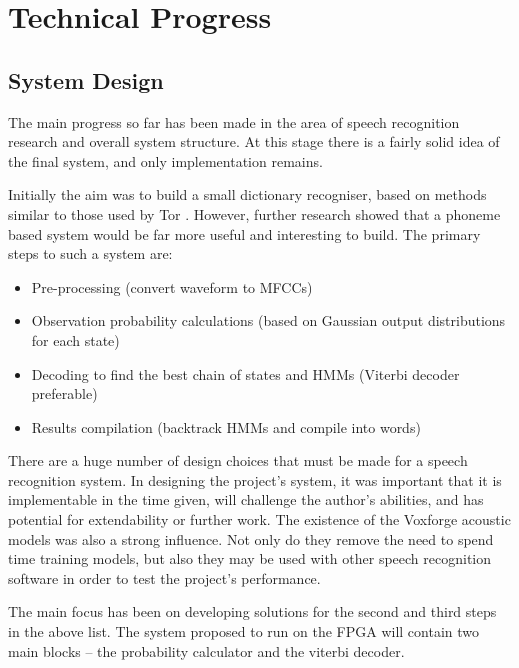 \chapter{Technical Progress} %
\label{cha:technical_progress}


\section{System Design} %
\label{sec:system_design}
The main progress so far has been made in the area of speech recognition research and overall system structure.  At this stage there is a fairly solid idea of the final system, and only implementation remains.

Initially the aim was to build a small dictionary recogniser, based on methods similar to those used by Tor \cite{tor2003}.  However, further research showed that a phoneme based system would be far more useful and interesting to build.  The primary steps to such a system are:
\begin{itemize}
	\item Pre-processing (convert waveform to MFCCs)
	\item Observation probability calculations (based on Gaussian output distributions for each state)
	\item Decoding to find the best chain of states and HMMs (Viterbi decoder preferable)
	\item Results compilation (backtrack HMMs and compile into words)
\end{itemize}

There are a huge number of design choices that must be made for a speech recognition system.  In designing the project's system, it was important that it is implementable in the time given, will challenge the author's abilities, and has potential for extendability or further work.  The existence of the Voxforge acoustic models was also a strong influence.  Not only do they remove the need to spend time training models, but also they may be used with other speech recognition software in order to test the project's performance.

The main focus has been on developing solutions for the second and third steps in the above list.  The system proposed to run on the FPGA will contain two main blocks -- the probability calculator and the viterbi decoder.  


